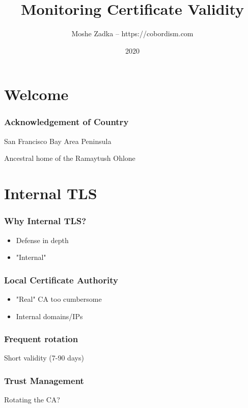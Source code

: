 \usepackage{hyperref}
\usepackage{graphicx}
\usepackage{listings}
\usepackage{textcomp}
\usepackage{fancyvrb}

\title{Monitoring Certificate Validity}
\author{Moshe Zadka -- https://cobordism.com}
\date{2020}


\begin{titlepage}
\maketitle
\end{titlepage}

\section{Welcome}

\frame{\titlepage}

\begin{frame}
\frametitle{Acknowledgement of Country}

San Francisco Bay Area Peninsula

Ancestral home of the Ramaytush Ohlone

\end{frame}

\section{Internal TLS}

\begin{frame}
\frametitle{Why Internal TLS?}

\begin{itemize}
\item Defense in depth
\item "Internal"
\end{itemize}

\end{frame}

\begin{frame}
\frametitle{Local Certificate Authority}

\begin{itemize}
\item "Real" CA too cumbersome
\item Internal domains/IPs
\end{itemize}

\end{frame}

\begin{frame}
\frametitle{Frequent rotation}

Short validity (7-90 days)

\end{frame}

\begin{frame}
\frametitle{Trust Management}

Rotating the CA?

\end{frame}


